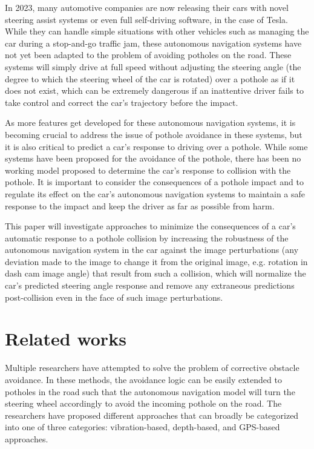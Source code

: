 \documentclass{article}
\begin{document}
In 2023, many automotive companies are now releasing their cars with novel steering assist systems or even full self-driving software, in the case of Tesla. While they can handle simple situations with other vehicles such as managing the car during a stop-and-go traffic jam, these autonomous navigation systems have not yet been adapted to the problem of avoiding potholes on the road. These systems will simply drive at full speed without adjusting the steering angle (the degree to which the steering wheel of the car is rotated) over a pothole as if it does not exist, which can be extremely dangerous if an inattentive driver fails to take control and correct the car's trajectory before the impact.

As more features get developed for these autonomous navigation systems, it is becoming crucial to address the issue of pothole avoidance in these systems, but it is also critical to predict a car's response to driving over a pothole. While some systems have been proposed for the avoidance of the pothole, there has been no working model proposed to determine the car's response to collision with the pothole. It is important to consider the consequences of a pothole impact and to regulate its effect on the car's autonomous navigation systems to maintain a safe response to the impact and keep the driver as far as possible from harm.

This paper will investigate approaches to minimize the consequences of a car's automatic response to a pothole collision by increasing the robustness of the autonomous navigation system in the car against the image perturbations (any deviation made to the image to change it from the original image, e.g. rotation in dash cam image angle) that result from such a collision, which will normalize the car's predicted steering angle response and remove any extraneous predictions post-collision even in the face of such image perturbations.

\section{Related works}

Multiple researchers have attempted to solve the problem of corrective obstacle avoidance. In these methods, the avoidance logic can be easily extended to potholes in the road such that the autonomous navigation model will turn the steering wheel accordingly to avoid the incoming pothole on the road. The researchers have proposed different approaches that can broadly be categorized into one of three categories: vibration-based, depth-based, and GPS-based approaches.
\end{document}
